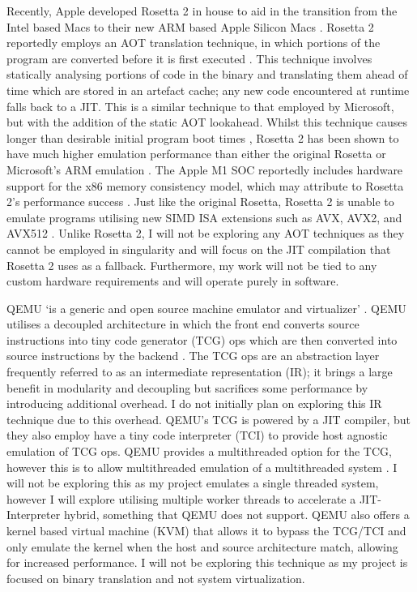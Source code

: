 Recently, Apple developed Rosetta 2 \cite{rosetta2} in house to aid in the transition from the Intel based Macs to their new ARM based Apple Silicon Macs \cite{rosetta2, apple-silicon}. Rosetta 2 reportedly employs an AOT translation technique, in which portions of the program are converted before it is first executed \cite{rosetta2-aot, ars-technica-big-sur}. This technique involves statically analysing portions of code in the binary and translating them ahead of time which are stored in an artefact cache; any new code encountered at runtime falls back to a JIT. This is a similar technique to that employed by Microsoft, but with the addition of the static AOT lookahead. Whilst this technique causes longer than desirable initial program boot times \cite{rosetta2-slow-launch}, Rosetta 2 has been shown to have much higher emulation performance than either the original Rosetta or Microsoft's ARM emulation \cite{rosetta2-perf}. The Apple M1 SOC reportedly includes hardware support for the x86 memory consistency model, which may attribute to Rosetta 2's performance success \cite{rosetta2-infoq}. Just like the original Rosetta, Rosetta 2 is unable to emulate programs utilising new SIMD ISA extensions such as AVX, AVX2, and AVX512 \cite{rosetta2}. Unlike Rosetta 2, I will not be exploring any AOT techniques as they cannot be employed in singularity and will focus on the JIT compilation that Rosetta 2 uses as a fallback. Furthermore, my work will not be tied to any custom hardware requirements and will operate purely in software.

QEMU `is a generic and open source machine emulator and virtualizer' \cite{qemu}. QEMU utilises a decoupled architecture in which the front end converts source instructions into tiny code generator (TCG) ops which are then converted into source instructions by the backend \cite{qemu-tcg}. The TCG ops are an abstraction layer frequently referred to as an intermediate representation (IR); it brings a large benefit in modularity and decoupling but sacrifices some performance by introducing additional overhead. I do not initially plan on exploring this IR technique due to this overhead. QEMU's TCG is powered by a JIT compiler, but they also employ have a tiny code interpreter (TCI) to provide host agnostic emulation of TCG ops. QEMU provides a multithreaded option for the TCG, however this is to allow multithreaded emulation of a multithreaded system \cite{qemu-tcg-multithreading}. I will not be exploring this as my project emulates a single threaded system, however I will explore utilising multiple worker threads to accelerate a JIT-Interpreter hybrid, something that QEMU does not support. QEMU also offers a kernel based virtual machine (KVM) that allows it to bypass the TCG/TCI and only emulate the kernel when the host and source architecture match, allowing for increased performance. I will not be exploring this technique as my project is focused on binary translation and not system virtualization.